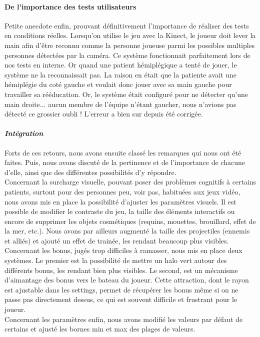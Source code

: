 \paragraph{De l'importance des tests utilisateurs\\}Petite anecdote enfin, prouvant définitivement l'importance de réaliser des tests en conditions réelles. Lorsqu'on utilise le jeu avec la Kinect, le joueur doit lever la main afin d'être reconnu comme la personne joueuse parmi les possibles multiples personnes détectées par la caméra. Ce système fonctionnait parfaitement lors de nos tests en interne. Or quand une patient hémiplégique a tenté de jouer, le système ne la reconnaissait pas. La raison en était que la patiente avait une hémiplégie du coté gauche et voulait donc jouer avec sa main gauche pour travailler sa rééducation. Or, le système était configuré pour ne détecter qu'une main droite... aucun membre de l'équipe n'étant gaucher, nous n'avions pas détecté ce grossier oubli ! L'erreur a bien sur depuis été corrigée.

	\paragraph{\emph{Intégration}\\}
	Forts de ces retours, nous avons ensuite classé les remarques qui nous ont été faites. Puis, nous avons discuté de la pertinence et de l'importance de chacune d'elle, ainsi que des différentes possibilités d'y répondre. \\
	Concernant la surcharge visuelle, pouvant poser des problèmes cognitifs à certains patients, surtout pour des personnes peu, voir pas, habituées aux jeux vidéo, nous avons mis en place la possibilité d'ajuster les paramètres visuels. Il est possible de modifier le contraste du jeu, la taille des éléments interactifs ou encore de supprimer les objets cosmétiques (requins, mouettes, brouillard, effet de la mer, etc.). Nous avons par ailleurs augmenté la taille des projectiles (ennemis et alliés) et ajouté un effet de trainée, les rendant beaucoup plus visibles.\\
	Concernant les bonus, jugés trop difficiles à ramasser, nous mis en place deux systèmes. Le premier est la possibilité de mettre un halo vert autour des différents bonus, les rendant bien plus visibles. Le second, est un mécanisme d'aimantage des bonus vers le bateau du joueur. Cette attraction, dont le rayon est ajustable dans les settings, permet de récupérer les bonus même si on ne passe pas directement dessus, ce qui est souvent difficile et frustrant pour le joueur.\\
Concernant les paramètres enfin, nous avons modifié les valeurs par défaut de certains et ajusté les bornes min et max des plages de valeurs.

